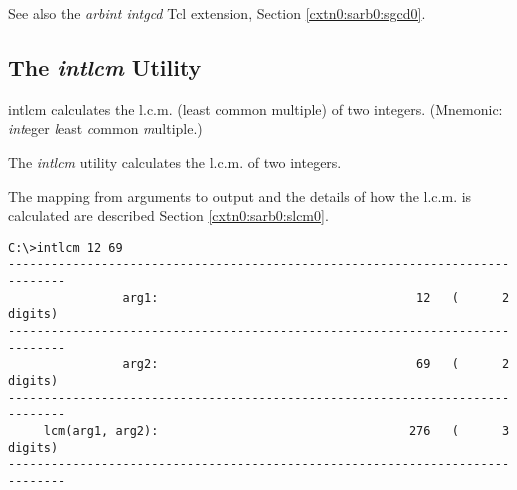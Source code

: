 \begin{dosutilcommandseealso}
See also the \emph{arbint intgcd} Tcl extension, 
Section \ref{cxtn0:sarb0:sgcd0}.
\end{dosutilcommandseealso}

\subsection{The \emph{intlcm} Utility}
\label{cdcm0:sali0:slcm0}

\begin{dosutilcommandname}{intlcm}%
calculates the l.c.m. (least common multiple)
of two integers.  (Mnemonic:  \emph{int}eger
\emph{l}east \emph{c}ommon \emph{m}ultiple.)
\end{dosutilcommandname}

\begin{dosutilcommandsynopsis}
\end{dosutilcommandsynopsis}

\begin{dosutilcommanddescription}
The \emph{intlcm} utility calculates the l.c.m. of two
integers.

The mapping from arguments to output and the details
of how the l.c.m. is calculated are described
Section \ref{cxtn0:sarb0:slcm0}.
\end{dosutilcommanddescription}

\begin{dosutilcommandsampleinvocations}
\begin{scriptsize}
\begin{verbatim}
C:\>intlcm 12 69
------------------------------------------------------------------------------
                arg1:                                    12   (      2 digits)
------------------------------------------------------------------------------
                arg2:                                    69   (      2 digits)
------------------------------------------------------------------------------
     lcm(arg1, arg2):                                   276   (      3 digits)
------------------------------------------------------------------------------
\end{verbatim}
\end{scriptsize}
\end{dosutilcommandsampleinvocations}

